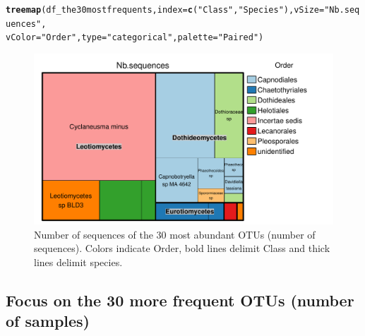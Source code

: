 \documentclass[12pt]{article}\usepackage[]{graphicx}\usepackage[]{color}
\makeatletter
\def\maxwidth{ %
  \ifdim\Gin@nat@width>\linewidth
    \linewidth
  \else
    \Gin@nat@width
  \fi
}
\newcommand{\hlstr}[1]{\textcolor[rgb]{0.192,0.494,0.8}{#1}}%
\newcommand{\hlstd}[1]{\textcolor[rgb]{0.345,0.345,0.345}{#1}}%
\newcommand{\hlkwc}[1]{\textcolor[rgb]{0.333,0.667,0.333}{#1}}%
\newcommand{\hlkwd}[1]{\textcolor[rgb]{0.737,0.353,0.396}{\textbf{#1}}}%
\newenvironment{kframe}{%
 \def\at@end@of@kframe{}%
 \ifinner\ifhmode%
  \def\at@end@of@kframe{\end{minipage}}%
  \begin{minipage}{\columnwidth}%
 \fi\fi%
 \def\FrameCommand##1{\hskip\@totalleftmargin \hskip-\fboxsep
 \colorbox{shadecolor}{##1}\hskip-\fboxsep
     \hskip-\linewidth \hskip-\@totalleftmargin \hskip\columnwidth}%
 \MakeFramed {\advance\hsize-\width
   \@totalleftmargin\z@ \linewidth\hsize
   \@setminipage}}%
 {\par\unskip\endMakeFramed%
 \at@end@of@kframe}
\newenvironment{knitrout}{}{} %
\numberwithin{figure}{section}
\makeatother
\begin{document}
\begin{knitrout}\small
{}\color{fgcolor}\begin{kframe}
\begin{alltt}
\hlkwd{treemap}\hlstd{(df_the30mostfrequents,} \hlkwc{index} \hlstd{=} \hlkwd{c}\hlstd{(}\hlstr{"Class"}\hlstd{,} \hlstr{"Species"}\hlstd{),} \hlkwc{vSize} \hlstd{=} \hlstr{"Nb.sequences"}\hlstd{,}
        \hlkwc{vColor} \hlstd{=} \hlstr{"Order"}\hlstd{,} \hlkwc{type} \hlstd{=} \hlstr{"categorical"}\hlstd{,} \hlkwc{palette} \hlstd{=} \hlstr{"Paired"}\hlstd{)}
\end{alltt}
\end{kframe}\begin{figure}

{\centering \includegraphics[width=\maxwidth]{figure/unnamed-chunk-28-1} 

}

\caption[Number of sequences of the 30 most abundant OTUs (number of sequences)]{Number of sequences of the 30 most abundant OTUs (number of sequences). Colors indicate Order, bold lines delimit Class and thick lines delimit species.}\label{fig:unnamed-chunk-28}
\end{figure}


\end{knitrout}

  \subsection{Focus on the 30 more frequent OTUs (number of samples)}
\end{document}
